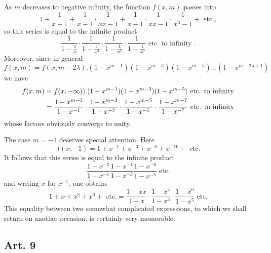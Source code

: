 \documentclass{book}
\theoremstyle{plain}
\theoremstyle{remark}
\begin{document}
 As $m$ decreases to negative infinity, the function $f(x,m)$ passes into
 \[ 1 + \frac{1}{x-1} + \frac{1}{x-1} \cdot \frac{1}{xx-1} + \frac{1}{x-1} \cdot \frac{1}{xx-1} \cdot \frac{1}{x^3-1} + \textrm{ etc.}, \]
 so this series is equal to the infinite product 
 \[ \frac{1}{1-\frac{1}{x}} \cdot \frac{1}{1-\frac{1}{x^3}} \cdot \frac{1}{1-\frac{1}{x^5}} \cdot \frac{1}{1-\frac{1}{x^7}} \textrm{ etc. to infinity } .\]
 Moreover, since in general
 \[ f(x,m) = f(x,m-2\lambda) . (1-x^{m-1})(1-x^{m-3})(1-x^{m-5})\dots(1-x^{m-2\lambda+1}) \]
 we have 
 \begin{align*}
  f(x,m) &= f(x,-\infty)) . (1-x^{m-1})(1-x^{m-3})(1-x^{m-5}) \textrm{ etc. to infinity} \\ \vspace{10mm}
  &= \frac{1-x^{m-1}}{1-x^{-1}} \cdot \frac{1-x^{m-3}}{1-x^{-3}} \cdot \frac{1-x^{m-5}}{1-x^{-5}} \cdot \frac{1-x^{m-7}}{1-x^{-7}} \textrm{ etc. to infinity} 
  \end{align*}
whose factors obviously converge to unity.  

The case $m=-1$ deserves special attention.  Here
\[ f(x,-1) = 1 + x^{-1} + x^{-3} + x^{-6} + x^{-10} + \textrm{ etc.} \]
It follows that this series is equal to the infinite product
\[ \frac{1-x^{-2}}{1-x^{-1}} \frac{1-x^{-4}}{1-x^{-3}} \frac{1-x^{-6}}{1-x^{-5}} \textrm{ etc.} \]
and writing $x$ for $x^{-1}$, one obtains
\[ 1 + x + x^3 + x^6 + \textrm{ etc.} = \frac{1-xx}{1-x} \cdot \frac{1-x^4}{1-x^3} \cdot \frac{1-x^6}{1-x^5} \textrm{ etc.}  \]
This equality between two somewhat complicated expressions, to which we shall return on another occasion, is certainly very memorable.

\subsection*{Art. 9} 
\end{document}
